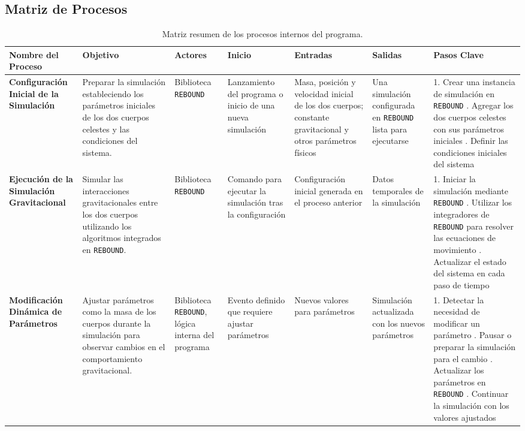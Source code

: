 \subsection{Matriz de Procesos}
\begin{table}[H]
    \centering
    \caption{Matriz resumen de los procesos internos del programa.}%
    \label{tab:matriz_procesos}
    \begin{adjustbox}{max width=\textwidth}
        \begin{tabular}{@{}p{5cm} p{3cm} p{2.5cm} p{2.5cm} p{2.5cm} p{3cm} p{4cm}@{}}
            \toprule
            \textbf{Nombre del Proceso} & \textbf{Objetivo} & \textbf{Actores} & \textbf{Inicio} & \textbf{Entradas} & \textbf{Salidas} & \textbf{Pasos Clave} \\
            \midrule
            \textbf{Configuración Inicial de la Simulación} & Preparar la simulación estableciendo los parámetros iniciales de los dos cuerpos celestes y las condiciones del sistema. & Biblioteca \texttt{REBOUND} & Lanzamiento del programa o inicio de una nueva simulación & Masa, posición y velocidad inicial de los dos cuerpos; constante gravitacional y otros parámetros físicos & Una simulación configurada en \texttt{REBOUND} lista para ejecutarse & 1. Crear una instancia de simulación en \texttt{REBOUND} \newline 2. Agregar los dos cuerpos celestes con sus parámetros iniciales \newline 3. Definir las condiciones iniciales del sistema \\
            \midrule
            \textbf{Ejecución de la Simulación Gravitacional} & Simular las interacciones gravitacionales entre los dos cuerpos utilizando los algoritmos integrados en \texttt{REBOUND}. & Biblioteca \texttt{REBOUND} & Comando para ejecutar la simulación tras la configuración & Configuración inicial generada en el proceso anterior & Datos temporales de la simulación & 1. Iniciar la simulación mediante \texttt{REBOUND} \newline 2. Utilizar los integradores de \texttt{REBOUND} para resolver las ecuaciones de movimiento \newline 3. Actualizar el estado del sistema en cada paso de tiempo \\
            \midrule
            \textbf{Modificación Dinámica de Parámetros} & Ajustar parámetros como la masa de los cuerpos durante la simulación para observar cambios en el comportamiento gravitacional. & Biblioteca \texttt{REBOUND}, lógica interna del programa & Evento definido que requiere ajustar parámetros & Nuevos valores para parámetros & Simulación actualizada con los nuevos parámetros & 1. Detectar la necesidad de modificar un parámetro \newline 2. Pausar o preparar la simulación para el cambio \newline 3. Actualizar los parámetros en \texttt{REBOUND} \newline 4. Continuar la simulación con los valores ajustados \\

\end{tabular}
\end{adjustbox}
\end{table}
